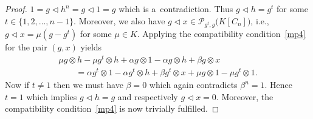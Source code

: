 \documentclass[11pt]{article}
\numberwithin{equation}{section}
\begin{document}
\begin{proof}
$1 = g \triangleleft h^{n} = g \triangleleft 1 = g$ which is a~contradiction. Thus $g \triangleleft h = g^{t}$ for some $t \in \{1, 2,\dots, n-1\}$. Moreover, we also have $g \triangleleft x \in \mathcal{P}_{g^{t}, g} \big(K[C_{n}]\big)$, i.e., $g \triangleleft x = \mu(g - g^{t})$ for some $\mu \in K$. Applying the compatibility condition~\eqref{mp4} for the pair $(g, x)$ yields
\begin{gather*}
\mu g \otimes h - \mu g^{t} \otimes h + \alpha g \otimes 1 - \alpha g \otimes h + \beta g \otimes x \\
\qquad{} = \alpha g^{t} \otimes 1 - \alpha g^{t} \otimes h + \beta g^{t} \otimes x + \mu g \otimes 1 - \mu g^{t} \otimes 1.
\end{gather*}
Now if $t \neq 1$ then we must have $\beta = 0$ which again contradicts $\beta^{n} = 1$. Hence $t = 1$ which implies $g \triangleleft h = g$ and respectively $g \triangleleft x = 0$. Moreover, the compatibility condition~\eqref{mp4} is now trivially fulfilled.


\end{proof}
\end{document}

